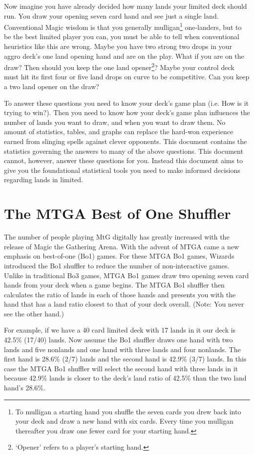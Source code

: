 \documentclass[oneside]{book}   %
\begin{document}
Now imagine you have already decided how many lands your limited deck should run. You draw your opening seven card hand and see just a single land. Conventional Magic wisdom is that you generally mulligan\footnote{To mulligan a starting hand you shuffle the seven cards you drew back into your deck and draw a new hand with six cards. Every time you mulligan thereafter you draw one fewer card for your starting hand.} one-landers, but to be the best limited player you can, you must be able to tell when conventional heuristics like this are wrong. Maybe you have two strong two drops in your aggro deck's one land opening hand and are on the play. What if you are on the draw? Then should you keep the one land opener\footnote{`Opener' refers to a player's starting hand.}? Maybe your control deck must hit its first four or five land drops on curve to be competitive. Can you keep a two land opener on the draw? 

To answer these questions you need to know your deck's game plan (i.e. How is it trying to win?). Then you need to know how your deck's game plan influences the number of lands you want to draw, and when you want to draw them. No amount of statistics, tables, and graphs can replace the hard-won experience earned from slinging spells against clever opponents. This document contains the statistics governing the answers to many of the above questions. This document cannot, however, answer these questions for you. Instead this document aims to give you the foundational statistical tools you need to make informed decisions regarding lands in limited.

\section{The MTGA Best of One Shuffler}
\label{sec:computers_overview}

The number of people playing MtG digitally has greatly increased with the release of Magic the Gathering Arena. With the advent of MTGA came a new emphasis on best-of-one (Bo1) games. For these MTGA Bo1 games, Wizards introduced the Bo1 shuffler to reduce the number of non-interactive games. Unlike in traditional Bo3 games, MTGA Bo1 games draw two opening seven card hands from your deck when a game begins. The MTGA Bo1 shuffler then calculates the ratio of lands in each of those hands and presents you with the hand that has a land ratio closest to that of your deck overall. (Note: You never see the other hand.)

For example, if we have a 40 card limited deck with 17 lands in it our deck is 42.5\% (17/40) lands. Now assume the Bo1 shuffler draws one hand with two lands and five nonlands and one hand with three lands and four nonlands. The first hand is 28.6\% (2/7) lands and the second hand is 42.9\% (3/7) lands. In this case the MTGA Bo1 shuffler will select the second hand with three lands in it because 42.9\% lands is closer to the deck's land ratio of 42.5\% than the two land hand's 28.6\%. 
\end{document}
